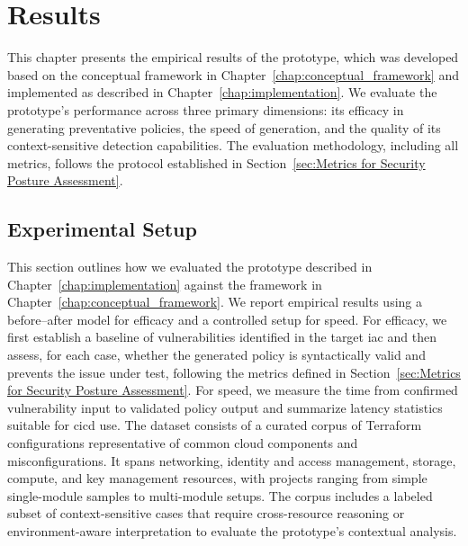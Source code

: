 
\chapter{Results}\label{chap:results}

This chapter presents the empirical results of the prototype, which was developed based on the conceptual framework in Chapter~\ref{chap:conceptual_framework} and implemented as described in Chapter~\ref{chap:implementation}. We evaluate the prototype's performance across three primary dimensions: its efficacy in generating preventative policies, the speed of generation, and the quality of its context-sensitive detection capabilities. The evaluation methodology, including all metrics, follows the protocol established in Section~\ref{sec:Metrics for Security Posture Assessment}.

\section{Experimental Setup}
\label{sec:experimental-setup}

This section outlines how we evaluated the prototype described in Chapter~\ref{chap:implementation} against the framework in Chapter~\ref{chap:conceptual_framework}. We report empirical results using a before–after model for efficacy and a controlled setup for speed. For efficacy, we first establish a baseline of vulnerabilities identified in the target \gls{iac} and then assess, for each case, whether the generated policy is syntactically valid and prevents the issue under test, following the metrics defined in Section~\ref{sec:Metrics for Security Posture Assessment}. For speed, we measure the time from confirmed vulnerability input to validated policy output and summarize latency statistics suitable for \gls{cicd} use.
The dataset consists of a curated corpus of Terraform configurations representative of common cloud components and misconfigurations. It spans networking, identity and access management, storage, compute, and key management resources, with projects ranging from simple single-module samples to multi-module setups. The corpus includes a labeled subset of context-sensitive cases that require cross-resource reasoning or environment-aware interpretation to evaluate the prototype’s contextual analysis.

